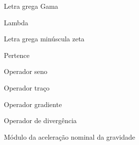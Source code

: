 %
%
%
%
%
%
%
\newcommand{\sen}{sen}
\newcommand{\trace}{tr}
\newcommand{\grad}{grad}
\newcommand{\diverg}{div}
\newcommand{\gravidade}{\texttt{g}}
\newcommand{\vetorn}{\underline{\texttt{n}}}
\newcommand{\desloc}{\underline{\xi}}
\newcommand{\tensorsigma}{\underline{\underline{\sigma}}}
\newcommand{\tensorSigma}{\underline{\underline{\Sigma}}}
\newcommand{\tensorepsilon}{\underline{\underline{\varepsilon}}}
\newcommand{\tensorBiot}{\underline{\underline{\textit{B}}}}
\newcommand{\tensorpermeabilidademicro}{\underline{\underline{\textit{k}}}^{\prime}}
\newcommand{\tensorpermeabilidadehom}{\underline{\underline{\textit{K}}}^{\prime \tiny{\mbox{hom}}}}
\newcommand{\energiamedia}{\left\langle\textit{U}\right\rangle}
\newcommand{\defmedia}{\langle\underline{\underline{\varepsilon}}\rangle}
\newcommand{\tensaomedia}{\langle\underline{\underline{\sigma}}\rangle}
\newcommand{\tensorC}{\mathbb{C}}
\newcommand{\identidadequarta}{\mathbb{I}}
\newcommand{\volume}{\left|\Omega\right|}
\newcommand{\volumeinicial}{\left|\Omega_{0} \right|}
%
%
%
%
%
\item[$ \Gamma $] 						Letra grega Gama
\item[$ \Lambda $] 						Lambda
\item[$ \zeta $] 						Letra grega minúscula zeta
\item[$ \in $] 							Pertence
%
\item[$ \sen $] 						Operador seno
\item[$ \trace $] 						Operador traço
\item[$ \grad $] 						Operador gradiente
\item[$ \diverg $]						Operador de divergência
\item[$ \gravidade $] 					Módulo da aceleração nominal da gravidade

